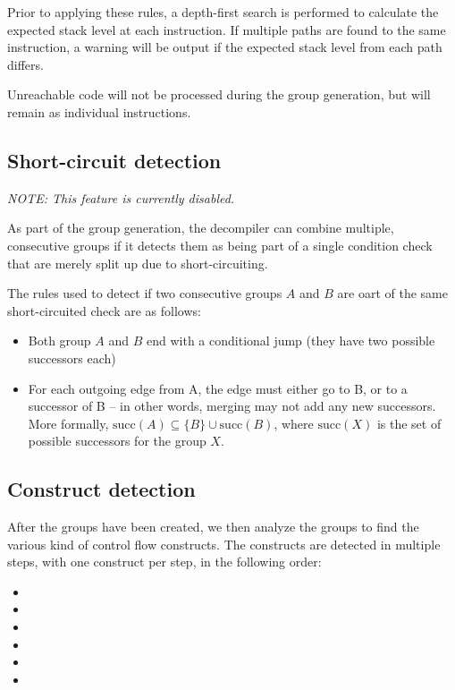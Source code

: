 Prior to applying these rules, a depth-first search is performed to calculate the expected stack level at each instruction. If multiple paths are found to the same instruction, a warning will be output if the expected stack level from each path differs.

Unreachable code will not be processed during the group generation, but will remain as individual instructions.

\subsection{Short-circuit detection}
\emph{NOTE: This feature is currently disabled.}

As part of the group generation, the decompiler can combine multiple, consecutive groups if it detects them as being part of a single condition check that are merely split up due to short-circuiting.

The rules used to detect if two consecutive groups $A$ and $B$ are oart of the same short-circuited check are as follows:
\begin{itemize}
\item Both group $A$ and $B$ end with a conditional jump (they have two possible successors each)
\item For each outgoing edge from A, the edge must either go to B, or to a successor of B -- in other words, merging may not add any new successors. More formally, $\text{succ}(A) \subseteq \{B\} \cup \text{succ}(B)$, where $\text{succ}(X)$ is the set of possible successors for the group $X$.
\end{itemize}

\subsection{Construct detection}
After the groups have been created, we then analyze the groups to find the various kind of control flow constructs. The constructs are detected in multiple steps, with one construct per step, in the following order:
\begin{itemize}
\item {}
\item {}
\item {}
\item {}
\item {}
\item {}
\end{itemize}


